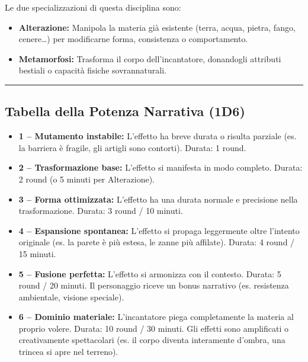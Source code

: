 \documentclass[./magie.tex]{subfiles}
\begin{document}
Le due specializzazioni di questa disciplina sono:

\begin{itemize}
\item \textbf{Alterazione:} Manipola la materia già esistente (terra, acqua, pietra, fango, cenere…) per modificarne forma, consistenza o comportamento.
\item \textbf{Metamorfosi:} Trasforma il corpo dell’incantatore, donandogli attributi bestiali o capacità fisiche sovrannaturali.
\end{itemize}

\vspace{0.2cm}
\noindent
\begin{center}
\rule{\textwidth}{0.4pt} 
\end{center}
\vspace{0.2cm}
\subsection*{Tabella della Potenza Narrativa (1D6)}
\begin{itemize}
\item \textbf{1 – Mutamento instabile:} L’effetto ha breve durata o risulta parziale (es. la barriera è fragile, gli artigli sono contorti). Durata: 1 round.
\item \textbf{2 – Trasformazione base:} L’effetto si manifesta in modo completo. Durata: 2 round (o 5 minuti per Alterazione).
\item \textbf{3 – Forma ottimizzata:} L’effetto ha una durata normale e precisione nella trasformazione. Durata: 3 round / 10 minuti.
\item \textbf{4 – Espansione spontanea:} L’effetto si propaga leggermente oltre l’intento originale (es. la parete è più estesa, le zanne più affilate). Durata: 4 round / 15 minuti.
\item \textbf{5 – Fusione perfetta:} L’effetto si armonizza con il contesto. Durata: 5 round / 20 minuti. Il personaggio riceve un bonus narrativo (es. resistenza ambientale, visione speciale).
\item \textbf{6 – Dominio materiale:} L’incantatore piega completamente la materia al proprio volere. Durata: 10 round / 30 minuti. Gli effetti sono amplificati o creativamente spettacolari (es. il corpo diventa interamente d’ombra, una trincea si apre nel terreno).
\end{itemize}
\end{document}
